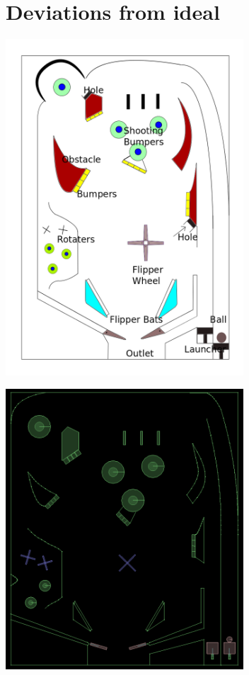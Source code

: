 \documentclass{article}
\begin{document}
    \section{Deviations from ideal}
    \begin{minipage}[t]{0.25\textwidth}
        \vspace{0pt}
        \centering
        \includegraphics[width=3.5in,natwidth=610,natheight=642]{pinball.png}
        \label{fig:Pinball}
    \end{minipage}
    \hspace{5cm}
    \begin{minipage}[t]{0.25\textwidth}
        \vspace{0pt}
        \centering
        \includegraphics[width=3.5in,natwidth=610,natheight=642]{final.png}
        \label{fig:Pinball}
    \end{minipage}
\end{document}
